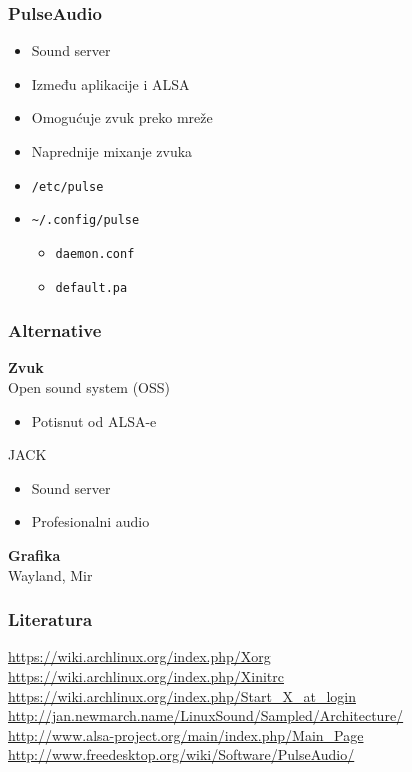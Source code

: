 \documentclass[t,table,usenames,dvipsnames]{beamer}
\begin{document}
\begin{frame}
	\frametitle{PulseAudio}
	\begin{itemize}
		\item Sound server
		\item Između aplikacije i ALSA
	\end{itemize}
	\vfill
	\begin{itemize}
		\item Omogućuje zvuk preko mreže
		\item Naprednije mixanje zvuka
	\end{itemize}
	\vfill
	\begin{itemize}
		\item[] \texttt{/etc/pulse}
		\item[] \texttt{\textasciitilde/.config/pulse}
		\begin{itemize}
			\item[] \texttt{daemon.conf}
			\item[] \texttt{default.pa}
		\end{itemize}
	\end{itemize}
\end{frame}


\begin{frame}
	\frametitle{Alternative}
	\textbf{Zvuk}\\
	Open sound system (OSS)
	\begin{itemize}
		\item Potisnut od ALSA-e
	\end{itemize}
	\vspace{1em}
	JACK
	\begin{itemize}
		\item Sound server
		\item Profesionalni audio
	\end{itemize}
	\vfill
	\textbf{Grafika}\\
	Wayland, Mir
	
\end{frame}


\begin{frame}
	\frametitle{Literatura}
	\url{https://wiki.archlinux.org/index.php/Xorg}\\
	\url{https://wiki.archlinux.org/index.php/Xinitrc}\\
	\url{https://wiki.archlinux.org/index.php/Start_X_at_login}
	\vfill
	\url{http://jan.newmarch.name/LinuxSound/Sampled/Architecture/}\\
	\url{http://www.alsa-project.org/main/index.php/Main_Page}\\
	\url{http://www.freedesktop.org/wiki/Software/PulseAudio/}
	\vfill
\end{frame}
\end{document}
